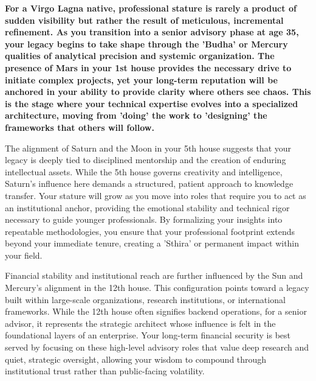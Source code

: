 
\label{topic41}

{\fontsize{9.5}{13.8}\selectfont\bfseries\color{DeepSlate} For a Virgo Lagna native, professional stature is rarely a product of sudden visibility but rather the result of meticulous, incremental refinement. As you transition into a senior advisory phase at age 35, your legacy begins to take shape through the 'Budha' or Mercury qualities of analytical precision and systemic organization. The presence of Mars in your 1st house provides the necessary drive to initiate complex projects, yet your long-term reputation will be anchored in your ability to provide clarity where others see chaos. This is the stage where your technical expertise evolves into a specialized architecture, moving from 'doing' the work to 'designing' the frameworks that others will follow.}\par\vspace{2mm}

{\fontsize{9}{13}\selectfont The alignment of Saturn and the Moon in your 5th house suggests that your legacy is deeply tied to disciplined mentorship and the creation of enduring intellectual assets. While the 5th house governs creativity and intelligence, Saturn's influence here demands a structured, patient approach to knowledge transfer. Your stature will grow as you move into roles that require you to act as an institutional anchor, providing the emotional stability and technical rigor necessary to guide younger professionals. By formalizing your insights into repeatable methodologies, you ensure that your professional footprint extends beyond your immediate tenure, creating a 'Sthira' or permanent impact within your field.}\par\vspace{1.8mm}

{\fontsize{9}{13}\selectfont Financial stability and institutional reach are further influenced by the Sun and Mercury's alignment in the 12th house. This configuration points toward a legacy built within large-scale organizations, research institutions, or international frameworks. While the 12th house often signifies backend operations, for a senior advisor, it represents the strategic architect whose influence is felt in the foundational layers of an enterprise. Your long-term financial security is best served by focusing on these high-level advisory roles that value deep research and quiet, strategic oversight, allowing your wisdom to compound through institutional trust rather than public-facing volatility.}\par\vspace{1.8mm}

